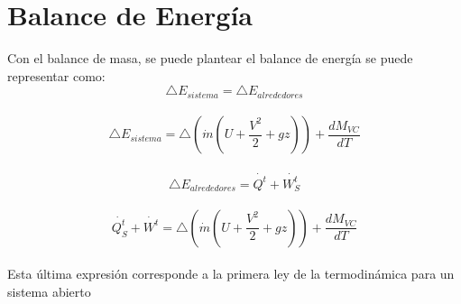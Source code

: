 \documentclass{article}
\begin{document}
\section{Balance de Energ\'ia}

Con el balance de masa, se puede plantear el balance de energía se puede representar como:\\

\begin{equation}
 \bigtriangleup{E_{sistema}} =  \bigtriangleup{E_{alrededores}}
\end{equation}
\\

\begin{equation}
 \bigtriangleup{E_{sistema}} =  \bigtriangleup{(\dot{m}(U + \dfrac{V ^{2}}{2} + gz))} + \dfrac{dM_{VC}}{dT}
\end{equation}
\\

\begin{equation}
 \bigtriangleup{E_{alrededores}} =  \dot{Q ^{t}} + \dot{W ^{t}_{S}}
\end{equation}
\\

\begin{equation}
 \dot{Q ^{t}_{S}} + \dot{W ^{t}} =  \bigtriangleup{(\dot{m}(U + \dfrac{V ^{2}}{2} + gz))} + \dfrac{dM_{VC}}{dT}
\end{equation}
\\

Esta última expresión corresponde a la primera ley de la termodinámica para un sistema abierto
\end{document}
